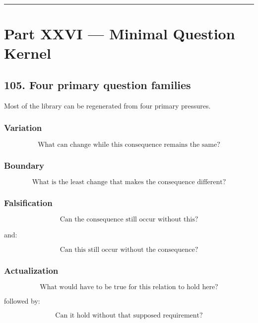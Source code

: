 \documentclass[
]{article}
\begin{document}
\begin{center}\rule{0.5\linewidth}{0.5pt}\end{center}

\section{Part XXVI --- Minimal Question
Kernel}\label{part-xxvi-minimal-question-kernel}

\subsection{105. Four primary question
families}\label{four-primary-question-families}

Most of the library can be regenerated from four primary pressures.

\subsubsection{Variation}\label{variation}

\[
\boxed{
\text{What can change while this consequence remains the same?}
}
\]

\subsubsection{Boundary}\label{boundary}

\[
\boxed{
\text{What is the least change that makes the consequence different?}
}
\]

\subsubsection{Falsification}\label{falsification}

\[
\boxed{
\text{Can the consequence still occur without this?}
}
\]

and:

\[
\boxed{
\text{Can this still occur without the consequence?}
}
\]

\subsubsection{Actualization}\label{actualization}

\[
\boxed{
\text{What would have to be true for this relation to hold here?}
}
\]

followed by:

\[
\boxed{
\text{Can it hold without that supposed requirement?}
}
\]
\end{document}
